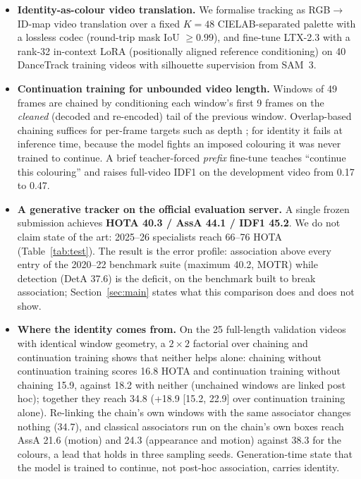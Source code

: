 \documentclass{article} %
\newcommand{\rev}[1]{#1}
\begin{document}
\begin{itemize}
\item \textbf{Identity-as-colour video translation.} We formalise tracking as RGB$\to$ID-map
video translation over a fixed $K{=}48$ CIELAB-separated palette with a lossless codec
(round-trip mask IoU $\geq 0.99$), and fine-tune LTX-2.3 with a rank-32 in-context LoRA
(positionally aligned reference conditioning) on 40 DanceTrack training videos with
silhouette supervision from SAM~3.

\item \textbf{Continuation training for unbounded video length.} Windows of 49 frames are
chained by conditioning each window's first 9 frames on the \emph{cleaned} (decoded and
re-encoded) tail of the previous window. Overlap-based chaining suffices for per-frame
targets such as depth \citep{hu2025depthcrafter}; for identity it fails at inference time,
because the model fights an imposed colouring it was never trained to continue. A brief
teacher-forced \emph{prefix} fine-tune teaches ``continue this colouring'' and raises
full-video IDF1 on the development video from 0.17 to 0.47.

\item \textbf{A generative tracker on the official evaluation server.} A single frozen
submission achieves \textbf{HOTA 40.3 / AssA 44.1 / IDF1 45.2}. We do not claim state of
the art: 2025--26 specialists reach 66--76 HOTA (Table~\ref{tab:test}). The result is the
error profile: association above every entry of the 2020--22 benchmark suite (maximum
40.2, MOTR) while detection (DetA 37.6) is the deficit, on the benchmark built to break
association; Section~\ref{sec:main} states what this comparison does and does not show.

\item \textbf{Where the identity comes from.} On the 25 full-length validation videos with
identical window geometry, \rev{a $2\times2$ factorial over chaining and continuation training
shows that neither helps alone: chaining without continuation training scores 16.8 HOTA and
continuation training without chaining 15.9, against 18.2 with neither (unchained windows
are linked post hoc); together they reach 34.8 (+18.9 [15.2, 22.9] over continuation
training alone).} Re-linking the chain's own windows with
the same associator changes nothing (34.7), and classical associators run on the chain's
own boxes reach AssA 21.6 (motion) and 24.3 (appearance and motion) against 38.3 for the
colours\rev{, a lead that holds in three sampling seeds}. Generation-time state \rev{that the
model is trained to continue}, not post-hoc association, carries identity.


\end{itemize}
\end{document}
